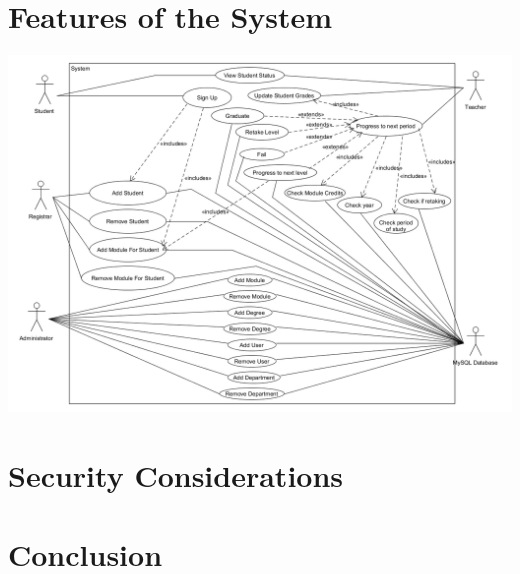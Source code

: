 \documentclass[12pt,a4paper]{article}
\begin{document}
\section{Features of the System}

\centerline{\includegraphics[width=20cm]{useCaseDiagram}}

\section{Security Considerations}

\section{Conclusion}
\end{document}
